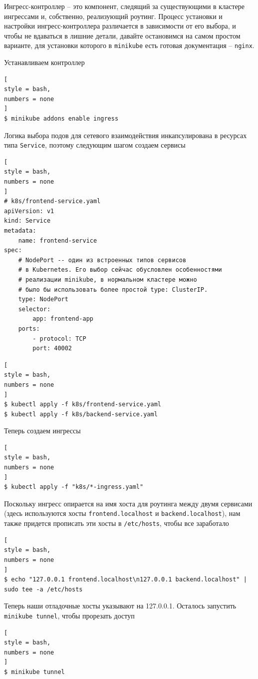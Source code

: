 \documentclass[%
	11pt,
	a4paper,
	utf8,
		]{article}
\begin{document}
Ингресс-контроллер -- это компонент, следящий за существующими в кластере ингрессами и, собственно, реализующий роутинг. Процесс установки и настройки ингресс-контроллера различается в зависимости от его выбора, и чтобы не вдаваться в лишние детали, давайте остановимся на самом простом варианте, для установки которого в \verb*|minikube| есть готовая документация -- \verb*|nginx|. 

Устанавливаем контроллер
\begin{lstlisting}[
style = bash,
numbers = none	
]
$ minikube addons enable ingress
\end{lstlisting}

Логика выбора подов для сетевого взаимодействия инкапсулирована в ресурсах типа \verb*|Service|, поэтому следующим шагом создаем сервисы
\begin{lstlisting}[
style = bash,
numbers = none
]
# k8s/frontend-service.yaml
apiVersion: v1
kind: Service
metadata:
	name: frontend-service
spec:
	# NodePort -- один из встроенных типов сервисов
	# в Kubernetes. Его выбор сейчас обусловлен особенностями
	# реализации minikube, в нормальном кластере можно
	# было бы использовать более простой type: ClusterIP.
	type: NodePort
	selector:
		app: frontend-app
	ports:
		- protocol: TCP
		port: 40002
\end{lstlisting}

\begin{lstlisting}[
style = bash,
numbers = none
]
$ kubectl apply -f k8s/frontend-service.yaml
$ kubectl apply -f k8s/backend-service.yaml
\end{lstlisting}

Теперь создаем ингрессы
\begin{lstlisting}[
style = bash,
numbers = none
]
$ kubectl apply -f "k8s/*-ingress.yaml"
\end{lstlisting}

Поскольку ингресс опирается на имя хоста для роутинга между двумя сервисами (здесь используются хосты \verb*|frontend.localhost| и \verb*|backend.localhost|), нам также придется прописать эти хосты в \verb*|/etc/hosts|, чтобы все заработало
\begin{lstlisting}[
style = bash,
numbers = none
]
$ echo "127.0.0.1 frontend.localhost\n127.0.0.1 backend.localhost" | sudo tee -a /etc/hosts
\end{lstlisting}

Теперь наши отладочные хосты указывают на 127.0.0.1. Осталось запустить \verb|minikube tunnel|, чтобы прорезать доступ
\begin{lstlisting}[
style = bash,
numbers = none
]
$ minikube tunnel
\end{lstlisting}
\end{document}
